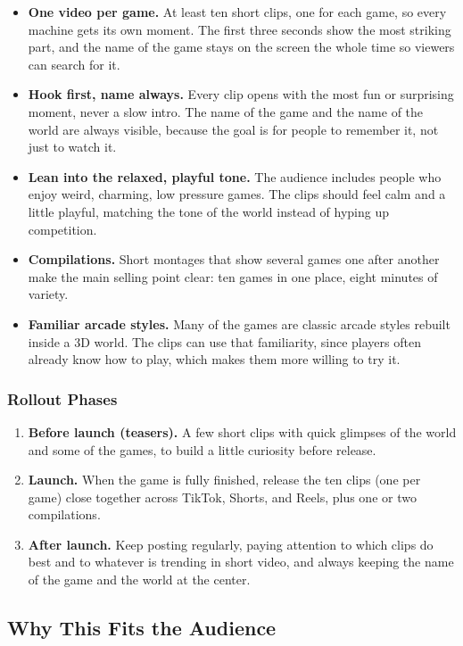 \documentclass[12pt,letterpaper]{article}
\begin{document}
\begin{itemize}
  \item \textbf{One video per game.} At least ten short clips, one for each game, so every machine gets its own moment. The first three seconds show the most striking part, and the name of the game stays on the screen the whole time so viewers can search for it.
  \item \textbf{Hook first, name always.} Every clip opens with the most fun or surprising moment, never a slow intro. The name of the game and the name of the world are always visible, because the goal is for people to remember it, not just to watch it.
  \item \textbf{Lean into the relaxed, playful tone.} The audience includes people who enjoy weird, charming, low pressure games. The clips should feel calm and a little playful, matching the tone of the world instead of hyping up competition.
  \item \textbf{Compilations.} Short montages that show several games one after another make the main selling point clear: ten games in one place, eight minutes of variety.
  \item \textbf{Familiar arcade styles.} Many of the games are classic arcade styles rebuilt inside a 3D world. The clips can use that familiarity, since players often already know how to play, which makes them more willing to try it.
\end{itemize}

\subsubsection{Rollout Phases}

\begin{enumerate}
  \item \textbf{Before launch (teasers).} A few short clips with quick glimpses of the world and some of the games, to build a little curiosity before release.
  \item \textbf{Launch.} When the game is fully finished, release the ten clips (one per game) close together across TikTok, Shorts, and Reels, plus one or two compilations.
  \item \textbf{After launch.} Keep posting regularly, paying attention to which clips do best and to whatever is trending in short video, and always keeping the name of the game and the world at the center.
\end{enumerate}

\subsection{Why This Fits the Audience}
\end{document}

